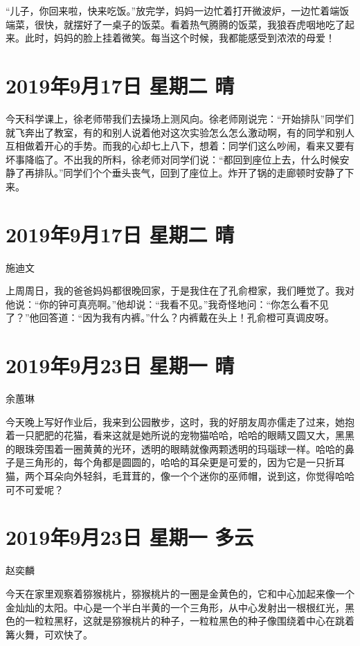 ``儿子，你回来啦，快来吃饭。''放完学，妈妈一边忙着打开微波炉，一边忙着端饭端菜，很快，就摆好了一桌子的饭菜。看着热气腾腾的饭菜，我狼吞虎咽地吃了起来。此时，妈妈的脸上挂着微笑。每当这个时候，我都能感受到浓浓的母爱！

\section{2019年9月17日 星期二 晴}

今天科学课上，徐老师带我们去操场上测风向。徐老师刚说完：``开始排队''同学们就飞奔出了教室，有的和别人说着他对这次实验怎么怎么激动啊，有的同学和别人互相做着开心的手势。而我的心却七上八下，想着：同学们这么吵闹，看来又要有坏事降临了。不出我的所料，徐老师对同学们说：``都回到座位上去，什么时候安静了再排队。''同学们个个垂头丧气，回到了座位上。炸开了锅的走廊顿时安静了下来。

\section{2019年9月17日 星期二 晴}

施迪文

上周周日，我的爸爸妈妈都很晚回家，于是我住在了孔俞橙家，我们睡觉了。我对他说：``你的钟可真亮啊。''他却说：``我看不见。''我奇怪地问：``你怎么看不见了？''他回答道：``因为我有内裤。''什么？内裤戴在头上！孔俞橙可真调皮呀。

\section{2019年9月23日 星期一 晴}

余蕙琳

今天晚上写好作业后，我来到公园散步，这时，我的好朋友周亦儒走了过来，她抱着一只肥肥的花猫，看来这就是她所说的宠物猫哈哈，哈哈的眼睛又圆又大，黑黑的眼珠旁围着一圈黄黄的光环，透明的眼睛就像两颗透明的玛瑙球一样。哈哈的鼻子是三角形的，每个角都是圆圆的，哈哈的耳朵更是可爱的，因为它是一只折耳猫，两个耳朵向外轻斜，毛茸茸的，像一个个迷你的巫师帽，说到这，你觉得哈哈可不可爱呢？

\section{2019年9月23日 星期一 多云}

赵奕麟

今天在家里观察着猕猴桃片，猕猴桃片的一圈是金黄色的，它和中心加起来像一个金灿灿的太阳。中心是一个半白半黄的一个三角形，从中心发射出一根根红光，黑色的一粒粒黑籽，这就是猕猴桃片的种子，一粒粒黑色的种子像围绕着中心在跳着篝火舞，可欢快了。

